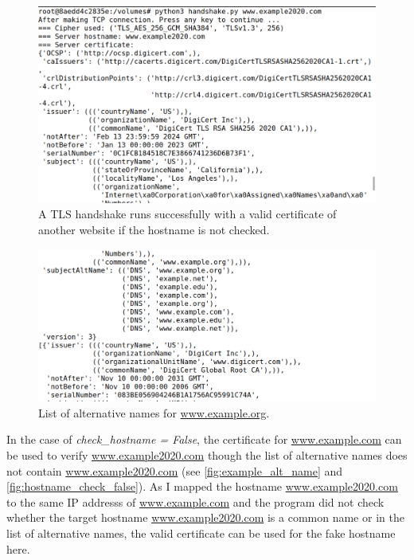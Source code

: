 \begin{figure}
    \centering
    \includegraphics[height=\textheight,width=\textwidth,keepaspectratio]
    {figures/hostname_check_false.png}
    \caption{A TLS handshake runs successfully with a valid certificate of another
    website if the hostname is not checked.}
    \label{fig:hostname_check_false}
\end{figure}

\begin{figure}
    \centering
    \includegraphics[height=\textheight,width=\textwidth,keepaspectratio]
    {figures/alt_name_example.png}
    \caption{List of alternative names for \url{www.example.org}.}
    \label{fig:example_alt_name}
\end{figure}

In the case of \emph{check\_hostname = False}, the certificate for \url{www.example.com}
can be used to verify \url{www.example2020.com} though the list of alternative names
does not contain \url{www.example2020.com} (see \autoref{fig:example_alt_name} and
\autoref{fig:hostname_check_false}). As I mapped the hostname \url{www.example2020.com}
to the same IP addresss of \url{www.example.com} and the program did not check whether
the target hostname \url{www.example2020.com} is a common name or in the list of
alternative names, the valid certificate can be used for the fake hostname here.

